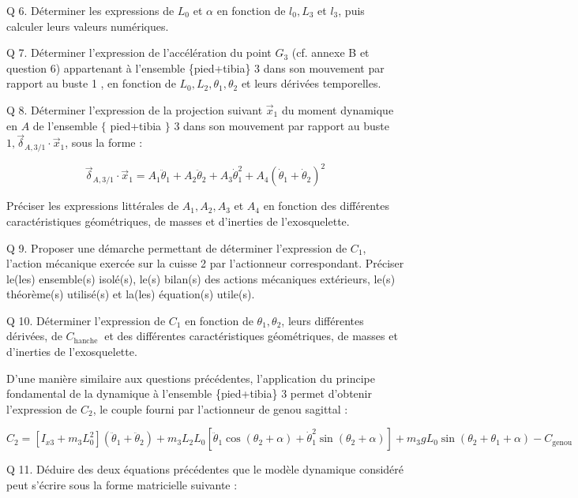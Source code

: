 \documentclass[10pt]{article}
\begin{document}
Q 6. Déterminer les expressions de $L_{0}$ et $\alpha$ en fonction de $l_{0}, L_{3}$ et $l_{3}$, puis calculer leurs valeurs numériques.

Q 7. Déterminer l'expression de l'accélération du point $G_{3}$ (cf. annexe B et question 6) appartenant à l'ensemble \{pied+tibia\} 3 dans son mouvement par rapport au buste 1 , en fonction de $L_{0}, L_{2}, \theta_{1}, \theta_{2}$ et leurs dérivées temporelles.

Q 8. Déterminer l'expression de la projection suivant $\vec{x}_{1}$ du moment dynamique en $A$ de l'ensemble $\{$ pied+tibia $\}$ 3 dans son mouvement par rapport au buste $1, \vec{\delta}_{A, 3 / 1} \cdot \vec{x}_{1}$, sous la forme :

$$
\vec{\delta}_{A, 3 / 1} \cdot \vec{x}_{1}=A_{1} \ddot{\theta}_{1}+A_{2} \ddot{\theta}_{2}+A_{3} \dot{\theta}_{1}^{2}+A_{4}\left(\dot{\theta}_{1}+\dot{\theta}_{2}\right)^{2}
$$

Préciser les expressions littérales de $A_{1}, A_{2}, A_{3}$ et $A_{4}$ en fonction des différentes caractéristiques géométriques, de masses et d'inerties de l'exosquelette.

Q 9. Proposer une démarche permettant de déterminer l'expression de $C_{1}$, l'action mécanique exercée sur la cuisse 2 par l'actionneur correspondant. Préciser le(les) ensemble(s) isolé(s), le(s) bilan(s) des actions mécaniques extérieurs, le(s) théorème(s) utilisé(s) et la(les) équation(s) utile(s).

Q 10. Déterminer l'expression de $C_{1}$ en fonction de $\theta_{1}, \theta_{2}$, leurs différentes dérivées, de $C_{\text {hanche }}$ et des différentes caractéristiques géométriques, de masses et d'inerties de l'exosquelette.

D'une manière similaire aux questions précédentes, l'application du principe fondamental de la dynamique à l'ensemble \{pied+tibia\} 3 permet d'obtenir l'expression de $C_{2}$, le couple fourni par l'actionneur de genou sagittal :

$$
C_{2}=\left[I_{x 3}+m_{3} L_{0}^{2}\right]\left(\ddot{\theta}_{1}+\ddot{\theta}_{2}\right)+m_{3} L_{2} L_{0}\left[\ddot{\theta}_{1} \cos \left(\theta_{2}+\alpha\right)+\dot{\theta}_{1}^{2} \sin \left(\theta_{2}+\alpha\right)\right]+m_{3} g L_{0} \sin \left(\theta_{2}+\theta_{1}+\alpha\right)-C_{\text {genou }}
$$

Q 11. Déduire des deux équations précédentes que le modèle dynamique considéré peut s'écrire sous la forme matricielle suivante :
\end{document}
